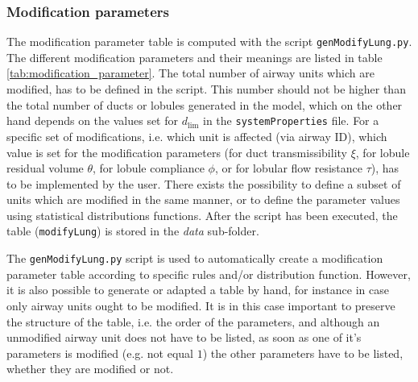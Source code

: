 \subsubsection{Modification parameters}
The modification parameter table is computed with the script \texttt{genModifyLung.py}.
The different modification parameters and their meanings are listed in table \ref{tab:modification_parameter}.
The total number of airway units which are modified, has to be defined in the script.
This number should not be higher than the total number of ducts or lobules generated in the model, which on the other hand depends on the values set for $d_\mathrm{lim}$ in the \texttt{systemProperties} file.
For a specific set of modifications, i.e. which unit is affected (via airway ID), which value is set for the modification parameters (for duct transmissibility $\xi$, for lobule residual volume $\theta$, for lobule compliance $\phi$, or for lobular flow resistance $\tau$), has to be implemented by the user.
There exists the possibility to define a subset of units which are modified in the same manner, or to define the parameter values using statistical distributions functions.
After the script has been executed, the table (\texttt{modifyLung}) is stored in the \textit{data} sub-folder.

The \texttt{genModifyLung.py} script is used to automatically create a modification parameter table according to specific rules and/or distribution function.
However, it is also possible to generate or adapted a table by hand, for instance in case only airway units ought to be modified.
It is in this case important to preserve the structure of the table, i.e. the order of the parameters, and although an unmodified airway unit does not have to be listed, as soon as one of it's parameters is modified (e.g. not equal $1$) the other parameters have to be listed, whether they are modified or not.

